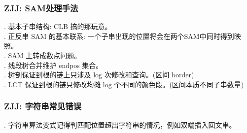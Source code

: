 \subsubsection*{ZJJ: SAM处理手法}
. 基本子串结构: CLB 搞的那玩意。\\	
. 正反串 SAM 的基本联系: 一个子串出现的位置将会在两个SAM中同时得到映照。\\	
. SAM 上转成数点问题。\\	
. 线段树合并维护 endpos 集合。\\	
. 树剖保证到根的链上只涉及 log 次修改和查询。(区间 border) \\	
. LCT 保证到根的链只修改均摊 log 个不同的颜色段。(区间本质不同子串数量)

\subsubsection*{ZJJ: 字符串常见错误}
. 字符串算法变式记得判匹配位置超出字符串的情况，例如双端插入回文串。